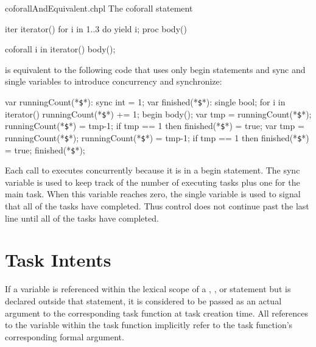 \begin{chapelexample}{coforallAndEquivalent.chpl}
The coforall statement
\begin{chapelpre}
iter iterator() { for i in 1..3 do yield i; }
proc body() { }
\end{chapelpre}
\begin{chapel}
coforall i in iterator() {
  body();
}
\end{chapel}
is equivalent to the following code that uses only begin statements
and sync and single variables to introduce concurrency and
synchronize:
\begin{chapel}
var runningCount(*\texttt{\$}*): sync int = 1;
var finished(*\texttt{\$}*): single bool;
for i in iterator() {
  runningCount(*\texttt{\$}*) += 1;
  begin {
    body();
    var tmp = runningCount(*\texttt{\$}*);
    runningCount(*\texttt{\$}*) = tmp-1;
    if tmp == 1 then finished(*\texttt{\$}*) = true;
  }
}
var tmp = runningCount(*\texttt{\$}*);
runningCount(*\texttt{\$}*) = tmp-1;
if tmp == 1 then finished(*\texttt{\$}*) = true;
finished(*\texttt{\$}*);
\end{chapel}
\begin{chapeloutput}
\end{chapeloutput}
Each call to  executes concurrently because it is in a
begin statement.  The sync
variable  is used to keep track
of the number of executing tasks plus one for the main task.  When
this variable reaches zero, the single
variable  is used to signal that
all of the tasks have completed.  Thus control does not continue past
the last line until all of the tasks have completed.
\end{chapelexample}


\section{Task Intents}
\label{Task_Intents}

If a variable is referenced within the lexical scope of a
, , or  statement
but is declared outside that statement, it is considered
to be passed as an actual argument to the corresponding task function 
at task creation time. All references to the variable
within the task function implicitly refer to the task function's
corresponding formal argument.

